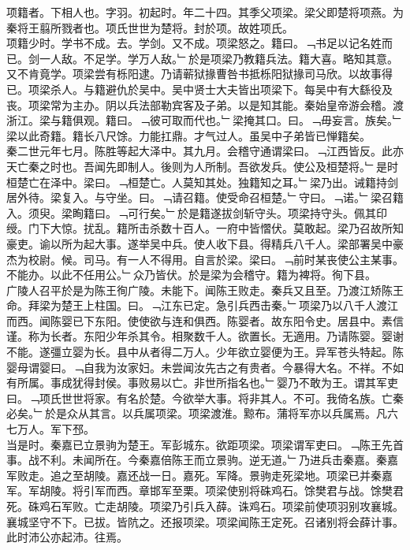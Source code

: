 \documentclass{zhvt-classic}
\begin{document}





\hspace*{2em}项籍者。下相人也。字羽。初起时。年二十四。其季父项梁。梁父即楚将项燕。为秦将王翦所戮者也。项氏世世为楚将。封於项。故姓项氏。\\
\hspace*{2em}项籍少时。学书不成。去。学剑。又不成。项梁怒之。籍曰。﹁书足以记名姓而已。剑一人敌。不足学。学万人敌。﹂於是项梁乃教籍兵法。籍大喜。略知其意。又不肯竟学。项梁尝有栎阳逮。乃请蕲狱掾曹咎书抵栎阳狱掾司马欣。以故事得已。项梁杀人。与籍避仇於吴中。吴中贤士大夫皆出项梁下。每吴中有大繇役及丧。项梁常为主办。阴以兵法部勒宾客及子弟。以是知其能。秦始皇帝游会稽。渡浙江。梁与籍俱观。籍曰。﹁彼可取而代也。﹂梁掩其口。曰。﹁毋妄言。族矣。﹂梁以此奇籍。籍长八尺馀。力能扛鼎。才气过人。虽吴中子弟皆已惮籍矣。\\
\hspace*{2em}秦二世元年七月。陈胜等起大泽中。其九月。会稽守通谓梁曰。﹁江西皆反。此亦天亡秦之时也。吾闻先即制人。後则为人所制。吾欲发兵。使公及桓楚将。﹂是时桓楚亡在泽中。梁曰。﹁桓楚亡。人莫知其处。独籍知之耳。﹂梁乃出。诫籍持剑居外待。梁复入。与守坐。曰。﹁请召籍。使受命召桓楚。﹂守曰。﹁诺。﹂梁召籍入。须臾。梁眴籍曰。﹁可行矣。﹂於是籍遂拔剑斩守头。项梁持守头。佩其印绶。门下大惊。扰乱。籍所击杀数十百人。一府中皆慴伏。莫敢起。梁乃召故所知豪吏。谕以所为起大事。遂举吴中兵。使人收下县。得精兵八千人。梁部署吴中豪杰为校尉。候。司马。有一人不得用。自言於梁。梁曰。﹁前时某丧使公主某事。不能办。以此不任用公。﹂众乃皆伏。於是梁为会稽守。籍为裨将。徇下县。\\
\hspace*{2em}广陵人召平於是为陈王徇广陵。未能下。闻陈王败走。秦兵又且至。乃渡江矫陈王命。拜梁为楚王上柱国。曰。﹁江东已定。急引兵西击秦。﹂项梁乃以八千人渡江而西。闻陈婴已下东阳。使使欲与连和俱西。陈婴者。故东阳令史。居县中。素信谨。称为长者。东阳少年杀其令。相聚数千人。欲置长。无適用。乃请陈婴。婴谢不能。遂彊立婴为长。县中从者得二万人。少年欲立婴便为王。异军苍头特起。陈婴母谓婴曰。﹁自我为汝家妇。未尝闻汝先古之有贵者。今暴得大名。不祥。不如有所属。事成犹得封侯。事败易以亡。非世所指名也。﹂婴乃不敢为王。谓其军吏曰。﹁项氏世世将家。有名於楚。今欲举大事。将非其人。不可。我倚名族。亡秦必矣。﹂於是众从其言。以兵属项梁。项梁渡淮。黥布。蒲将军亦以兵属焉。凡六七万人。军下邳。\\
\hspace*{2em}当是时。秦嘉已立景驹为楚王。军彭城东。欲距项梁。项梁谓军吏曰。﹁陈王先首事。战不利。未闻所在。今秦嘉倍陈王而立景驹。逆无道。﹂乃进兵击秦嘉。秦嘉军败走。追之至胡陵。嘉还战一日。嘉死。军降。景驹走死梁地。项梁已并秦嘉军。军胡陵。将引军而西。章邯军至栗。项梁使别将硃鸡石。馀樊君与战。馀樊君死。硃鸡石军败。亡走胡陵。项梁乃引兵入薛。诛鸡石。项梁前使项羽别攻襄城。襄城坚守不下。已拔。皆阬之。还报项梁。项梁闻陈王定死。召诸别将会薛计事。此时沛公亦起沛。往焉。\\
\end{document}
